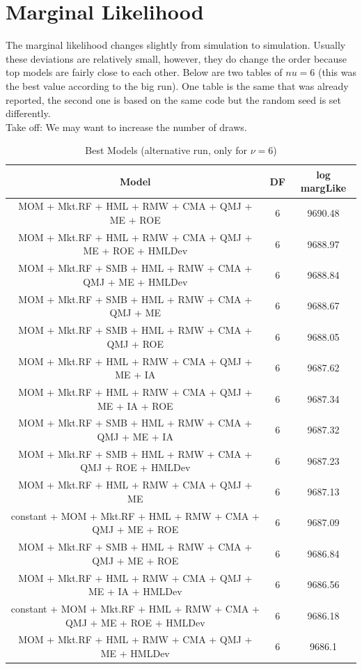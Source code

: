 \documentclass[12pt]{article}
\begin{document}
\section{Marginal Likelihood}
The marginal likelihood changes slightly from simulation to simulation. Usually these deviations are relatively small, however, they do change the order because top models are fairly close to each other.
Below are two tables of $nu = 6$ (this was the best value according to the big run). One table is the same that was already reported, the second one is based on the same code but the random seed is set differently. \\
Take off: We may want to increase the number of draws. \\
\begin{table}[!ht]
	\centering
	\footnotesize
	\begin{tabular}{ccc}
		\hline
		Model & DF & log margLike \\ 
		\hline
		MOM + Mkt.RF + HML + RMW + CMA + QMJ + ME + ROE & 6 & 9690.48 \\ 
		MOM + Mkt.RF + HML + RMW + CMA + QMJ + ME + ROE + HMLDev & 6 & 9688.97 \\ 
		MOM + Mkt.RF + SMB + HML + RMW + CMA + QMJ + ME + HMLDev & 6 & 9688.84 \\ 
		MOM + Mkt.RF + SMB + HML + RMW + CMA + QMJ + ME & 6 & 9688.67 \\ 
		MOM + Mkt.RF + SMB + HML + RMW + CMA + QMJ + ROE & 6 & 9688.05 \\ 
		MOM + Mkt.RF + HML + RMW + CMA + QMJ + ME + IA & 6 & 9687.62 \\ 
		MOM + Mkt.RF + HML + RMW + CMA + QMJ + ME + IA + ROE & 6 & 9687.34 \\ 
		MOM + Mkt.RF + SMB + HML + RMW + CMA + QMJ + ME + IA & 6 & 9687.32 \\ 
		MOM + Mkt.RF + SMB + HML + RMW + CMA + QMJ + ROE + HMLDev & 6 & 9687.23 \\ 
		MOM + Mkt.RF + HML + RMW + CMA + QMJ + ME & 6 & 9687.13 \\ 
		constant + MOM + Mkt.RF + HML + RMW + CMA + QMJ + ME + ROE & 6 & 9687.09 \\ 
		MOM + Mkt.RF + SMB + HML + RMW + CMA + QMJ + ME + ROE & 6 & 9686.84 \\ 
		MOM + Mkt.RF + HML + RMW + CMA + QMJ + ME + IA + HMLDev & 6 & 9686.56 \\ 
		constant + MOM + Mkt.RF + HML + RMW + CMA + QMJ + ME + ROE + HMLDev & 6 & 9686.18 \\ 
		MOM + Mkt.RF + HML + RMW + CMA + QMJ + ME + HMLDev & 6 & 9686.1 \\ 
		\hline
	\end{tabular}
	\caption{Best Models (alternative run, only for $\nu = 6$)}
\end{table}
\end{document}
